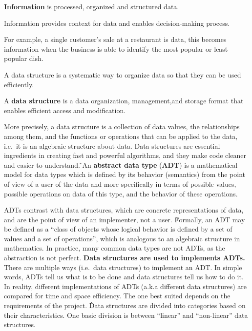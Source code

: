 \bd[Information]
\textbf{Information} is processed, organized and structured data.
\ed

Information provides context for data and enables decision-making process.

\be
For example, a single customer’s sale at a restaurant is data, this becomes information when the business is able to
identify the most popular or least popular dish.
\ee

A data structure is a systematic way to organize data so that they can be used efficiently.

A \textbf{data structure} is a data organization, management,and storage format that enables efficient access and
modification.
\ed

More precisely, a data structure is a collection of data values, the relationships among them, and the functions or
operations that can be applied to the data, i.e.\ it is an algebraic structure about data. Data structures are
essential ingredients in creating fast and powerful algorithms, and they make code cleaner and easier to understand. \v

An \textbf{abstract data type} (\textbf{ADT}) is a mathematical model for data types which is defined by its behavior
(semantics) from the point of view of a user of the data and more specifically in terms of possible values, possible
operations on data of this type, and the behavior of these operations.
\ed

ADTs contrast with data structures, which are concrete representations of data, and are the point of view of an
implementer, not a user. \v

Formally, an ADT may be defined as a ``class of objects whose logical behavior is defined by a set of values and a
set of operations'', which is analogous to an algebraic structure in mathematics. In practice, many common data types
are not ADTs, as the abstraction is not perfect. \v

\textbf{Data structures are used to implements ADTs.} There are multiple ways (i.e.\ data structures) to implement an
ADT. In simple words, ADTs tell us what is to be done and data structures tell us how to do it. In reality, different
implementations of ADTs (a.k.a different data structures) are compared for time and space efficiency. The one best
suited depends on the requirements of the project. \v

Data structures are divided into categories based on their characteristics. One basic division is between ``linear''
and ``non-linear'' data structures.

